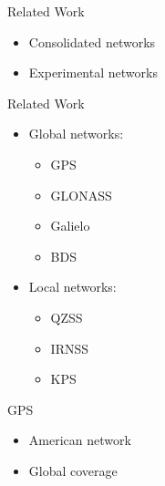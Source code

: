 %
%
%
%
%

%
%
%
%
%


\begin{frame}{Related Work}

    \begin{itemize}
        \item Consolidated networks
        \vspace{0.3cm}
        \item Experimental networks
    \end{itemize}

\end{frame}

\begin{frame}{Related Work}

    \begin{itemize}
        \item Global networks:
            \begin{itemize}
                \item GPS
                \item GLONASS
                \item Galielo
                \item BDS
            \end{itemize}
        \item Local networks:
            \begin{itemize}
                \item QZSS
                \item IRNSS
                \item KPS
            \end{itemize}
    \end{itemize}

\end{frame}

\begin{frame}{GPS}

    \begin{itemize}
        \item American network
        \item Global coverage
    \end{itemize}

\end{frame}

